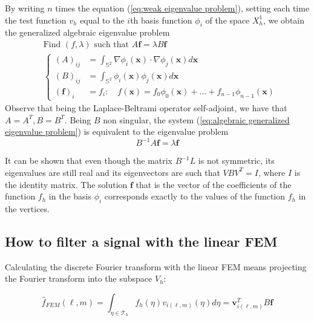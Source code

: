 By writing $n$ times the equation (\ref{eq:weak eigenvalue problem}), setting each time the test function $v_h$ equal to the $i$th basis function $\phi_i$ of the space $X_h^1$, we obtain the generalized algebraic eigenvalue problem
\begin{equation}\label{eq:algebraic generalized eigenvalue problem}
\begin{aligned}
&\text{Find }(f,\lambda)\text{ such that }A\mathbf f = \lambda B \mathbf f\\
&\begin{cases}
(A)_{ij} &= \int_{\mathbb S^2}\nabla \phi_i(\mathbf{x})\cdot \nabla \phi_j(\mathbf{x})d\mathbf{x}\\
(B)_{ij} &= \int_{\mathbb S^2} \phi_i(\mathbf{x}) \phi_j(\mathbf{x})d\mathbf{x}\\
(\mathbf f)_i &= f_i:\quad f(\mathbf x) = f_0\phi_0(\mathbf x)+ ... + f_{n-1}\phi_{n-1}(\mathbf x) 
\end{cases}
\end{aligned}
\end{equation}
Observe that being the Laplace-Beltrami operator self-adjoint, we have that $A=A^T, B=B^T$. Being $B$ non singular, the system (\ref{eq:algebraic generalized eigenvalue problem}) is equivalent to the eigenvalue problem
\begin{equation}\label{eq:algebraic  eigenvalue problem}
B^{-1}A\mathbf f = \lambda \mathbf f
\end{equation}

It can be shown \cite{Strang} that even though the matrix $B^{-1}L$ is not symmetric, its eigenvalues are still real and its eigenvectors are such that $VBV^T=I$, where $I$ is the identity matrix. The solution $\mathbf f$ that is the vector of the coefficients of the function $f_h$ in the basis $\phi_i$ corresponds exactly to the values of the function $f_h$ in the vertices. 

\subsection{How to filter a signal with the linear FEM}
Calculating the discrete Fourier transform with the linear FEM means projecting the Fourier transform into the subspace $V_h$:

\begin{equation}\label{eq:FEM fourier}
	\hat f_{FEM} (\ell, m) = \int_{\eta \in \mathcal T_h} f_h(\eta) v_{i(\ell, m)}(\eta) d\eta = \mathbf v_{i(\ell, m)}^T B \mathbf f
\end{equation}

